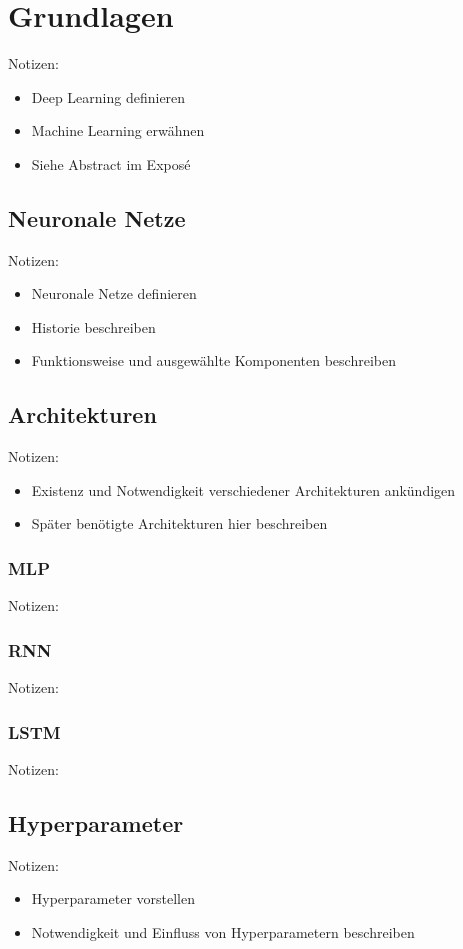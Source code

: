 \chapter{Grundlagen}
\thispagestyle{fancy}
\label{chap:Grundlagen}

Notizen:
\begin{itemize}
	\item Deep Learning definieren
	\item Machine Learning erwähnen
	\item Siehe Abstract im Exposé
\end{itemize}


\section{Neuronale Netze}
Notizen:
\begin{itemize}
	\item Neuronale Netze definieren
	\item Historie beschreiben
	\item Funktionsweise und ausgewählte Komponenten beschreiben
\end{itemize}


\section{Architekturen}
Notizen:
\begin{itemize}
	\item Existenz und Notwendigkeit verschiedener Architekturen ankündigen
	\item Später benötigte Architekturen hier beschreiben
\end{itemize}


\subsection{MLP}
Notizen:


\subsection{RNN}
Notizen:


\subsection{LSTM}
Notizen:


\section{Hyperparameter}
Notizen:
\begin{itemize}
	\item Hyperparameter vorstellen
	\item Notwendigkeit und Einfluss von Hyperparametern beschreiben
\end{itemize}
